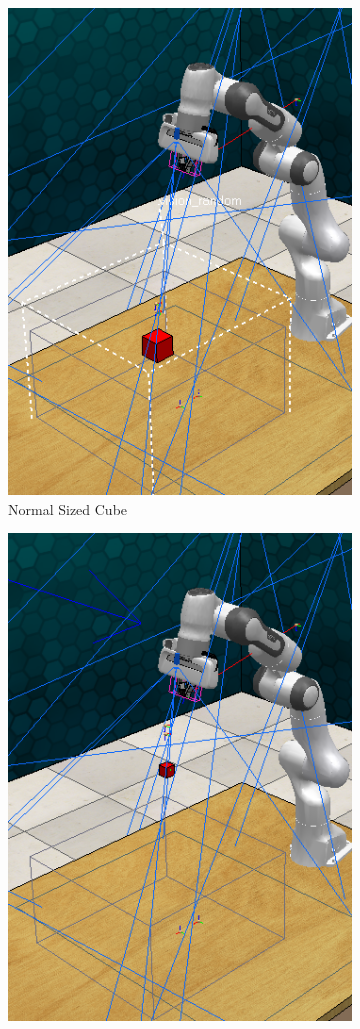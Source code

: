 \begin{figure}[htpb] %
  \begin{subfigure}{0.4\linewidth}
    \centering
    \includegraphics[width=0.7\linewidth]{assets/depth-interfacing/normal-size-grasp.png}
    \caption{Normal Sized Cube}\label{subfig:normal-grasp}
  \end{subfigure}
  \hfill
  \begin{subfigure}{0.4\linewidth}
    \centering
    \includegraphics[width=0.7\linewidth]{assets/depth-interfacing/smaller-grasp.png}

\end{subfigure}
\end{figure}
